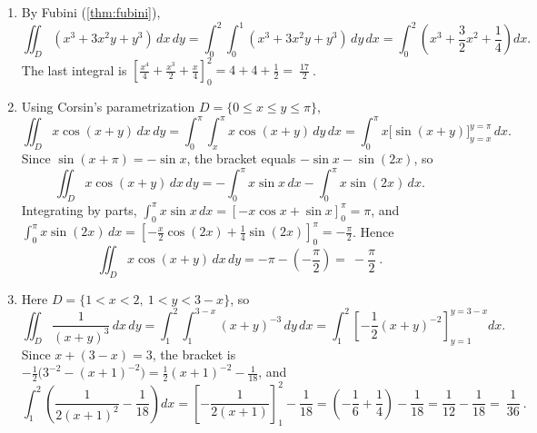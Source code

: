 \begin{exercisesolution}
\label{sol:curve_length_polar_and_vector_integral}
\begin{enumerate}[label=\textbf{(\alph*)}]
  \item By Fubini (\cref{thm:fubini}),
    \[\iint_D (x^3+3x^2y+y^3)\,dx\,dy = \int_0^2\int_0^1 (x^3+3x^2y+y^3)\,dy\,dx
      = \int_0^2\left(x^3+\frac32x^2+\frac14\right)dx.\]
    The last integral is
    $\left[\tfrac{x^4}{4}+\tfrac{x^3}{2}+\tfrac{x}{4}\right]_0^2 = 4+4+\tfrac12
    = \boxed{\ \tfrac{17}{2}\ }$.
  \item Using Corsin's parametrization $D=\{0\leq x\leq y\leq\pi\}$,
    \[\iint_D x\cos(x+y)\,dx\,dy = \int_0^\pi\int_x^\pi x\cos(x+y)\,dy\,dx
      = \int_0^\pi x\big[\sin(x+y)\big]_{y=x}^{y=\pi}\,dx.\]
    Since $\sin(x+\pi) = -\sin x$, the bracket equals $-\sin x - \sin(2x)$, so
    \[\iint_D x\cos(x+y)\,dx\,dy = -\int_0^\pi x\sin x\,dx - \int_0^\pi x\sin(2x)\,dx.\]
    Integrating by parts, $\int_0^\pi x\sin x\,dx = [-x\cos x+\sin x]_0^\pi = \pi$, and
    $\int_0^\pi x\sin(2x)\,dx = \left[-\tfrac{x}{2}\cos(2x)+\tfrac14\sin(2x)\right]_0^\pi
    = -\tfrac\pi2$. Hence
    \[\iint_D x\cos(x+y)\,dx\,dy = -\pi - \left(-\frac\pi2\right) = \boxed{\ -\frac\pi2\ }.\]
  \item Here $D = \{1<x<2,\ 1<y<3-x\}$, so
    \[\iint_D \frac{1}{(x+y)^3}\,dx\,dy = \int_1^2\int_1^{3-x} (x+y)^{-3}\,dy\,dx
      = \int_1^2 \left[-\frac12(x+y)^{-2}\right]_{y=1}^{y=3-x}dx.\]
    Since $x+(3-x)=3$, the bracket is $-\tfrac12\big(3^{-2}-(x+1)^{-2}\big)
    = \tfrac12(x+1)^{-2} - \tfrac1{18}$, and
    \[\int_1^2\left(\frac{1}{2(x+1)^2}-\frac1{18}\right)dx
      = \left[-\frac{1}{2(x+1)}\right]_1^2 - \frac1{18}
      = \left(-\frac16+\frac14\right) - \frac1{18} = \frac1{12}-\frac1{18}
      = \boxed{\ \frac1{36}\ }.\]
\end{enumerate}
\end{exercisesolution}


